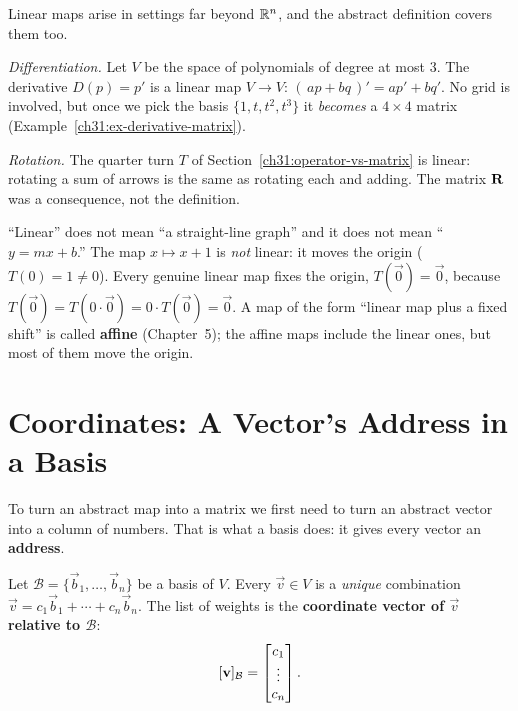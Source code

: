 \begin{example}
\label{ch31:ex-abstract-maps}
Linear maps arise in settings far beyond $\mathbb{R}^n$, and the abstract
definition covers them too.

\emph{Differentiation.} Let $V$ be the space of polynomials of degree at most $3$.
The derivative $D(p) = p'$ is a linear map $V\to V$:
$(\,a p + b q\,)' = a p' + b q'$. No grid is involved, but once we
pick the basis $\{1,t,t^2,t^3\}$ it \emph{becomes} a $4\times 4$ matrix
(Example~\ref{ch31:ex-derivative-matrix}).

\emph{Rotation.} The quarter turn $T$ of Section~\ref{ch31:operator-vs-matrix} is
linear: rotating a sum of arrows is the same as rotating each and adding. The
matrix $\mathbf{R}$ was a consequence, not the definition.
\end{example}

\begin{trapbox}
``Linear'' does not mean ``a straight-line graph'' and it does not mean
``$y=mx+b$.'' The map $x\mapsto x+1$ is \emph{not} linear: it moves the origin
($T(0)=1\neq 0$). Every genuine linear map fixes the origin, $T(\vec{0})=\vec{0}$,
because $T(\vec{0})=T(0\cdot\vec{0})=0\cdot T(\vec{0})=\vec{0}$. A map of the
form ``linear map plus a fixed shift'' is called \textbf{affine} (Chapter~5);
the affine maps include the linear ones, but most of them move the origin.
\end{trapbox}

\section{Coordinates: A Vector's Address in a Basis}
\label{ch31:coordinates}

To turn an abstract map into a matrix we first need to turn an abstract vector
into a column of numbers. That is what a basis does: it gives every vector an
\textbf{address}.

\begin{definition}
\label{ch31:def-coords}
Let $\mathcal{B} = \{\vec{b}_1,\dots,\vec{b}_n\}$ be a basis of $V$. Every
$\vec{v}\in V$ is a \emph{unique} combination
$\vec{v} = c_1\vec{b}_1 + \cdots + c_n\vec{b}_n$. The list of weights is the
\textbf{coordinate vector of $\vec{v}$ relative to $\mathcal{B}$}:
\[
  [\mathbf{v}]_{\mathcal{B}} = \begin{bmatrix}c_1\\\vdots\\c_n\end{bmatrix}.
\]
\end{definition}


